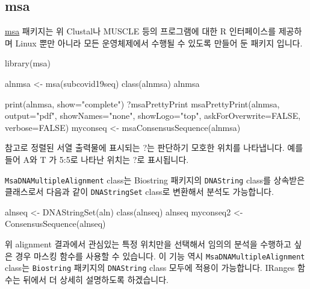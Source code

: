 \documentclass[
]{book}
\newenvironment{Shaded}{\begin{snugshade}}{\end{snugshade}}
\newcommand{\AttributeTok}[1]{\textcolor[rgb]{0.77,0.63,0.00}{#1}}
\newcommand{\ConstantTok}[1]{\textcolor[rgb]{0.00,0.00,0.00}{#1}}
\newcommand{\FunctionTok}[1]{\textcolor[rgb]{0.00,0.00,0.00}{#1}}
\newcommand{\NormalTok}[1]{#1}
\newcommand{\OtherTok}[1]{\textcolor[rgb]{0.56,0.35,0.01}{#1}}
\newcommand{\StringTok}[1]{\textcolor[rgb]{0.31,0.60,0.02}{#1}}
\begin{document}
\hypertarget{msa}{%
\subsection{msa}\label{msa}}

\href{https://www.bioconductor.org/packages/release/bioc/html/msa.html}{msa} 패키지는 위 Clustal나 MUSCLE 등의 프로그램에 대한 R 인터페이스를 제공하며 Linux 뿐만 아니라 모든 운영체제에서 수행될 수 있도록 만들어 둔 패키지 입니다.

\begin{Shaded}
\begin{Highlighting}[]
\FunctionTok{library}\NormalTok{(msa)}

\NormalTok{alnmsa }\OtherTok{\textless{}{-}} \FunctionTok{msa}\NormalTok{(subcovid19seq)}
\FunctionTok{class}\NormalTok{(alnmsa)}
\NormalTok{alnmsa}

\FunctionTok{print}\NormalTok{(alnmsa, }\AttributeTok{show=}\StringTok{"complete"}\NormalTok{)}
\NormalTok{?msaPrettyPrint}
\FunctionTok{msaPrettyPrint}\NormalTok{(alnmsa, }\AttributeTok{output=}\StringTok{"pdf"}\NormalTok{, }\AttributeTok{showNames=}\StringTok{"none"}\NormalTok{, }\AttributeTok{showLogo=}\StringTok{"top"}\NormalTok{, }\AttributeTok{askForOverwrite=}\ConstantTok{FALSE}\NormalTok{, }\AttributeTok{verbose=}\ConstantTok{FALSE}\NormalTok{)}
\NormalTok{myconseq }\OtherTok{\textless{}{-}} \FunctionTok{msaConsensusSequence}\NormalTok{(alnmsa)}
\end{Highlighting}
\end{Shaded}

참고로 정렬된 서열 출력물에 표시되는 ?는 판단하기 모호한 위치를 나타냅니다. 예를 들어 A와 T 가 5:5로 나타난 위치는 ?로 표시됩니다.

\texttt{MsaDNAMultipleAlignment} class는 Biostring 패키지의 \texttt{DNAString} class를 상속받은 클래스로서 다음과 같이 \texttt{DNAStringSet} class로 변환해서 분석도 가능합니다.

\begin{Shaded}
\begin{Highlighting}[]
\NormalTok{alnseq }\OtherTok{\textless{}{-}} \FunctionTok{DNAStringSet}\NormalTok{(aln)}
\FunctionTok{class}\NormalTok{(alnseq)}
\NormalTok{alnseq}
\NormalTok{myconseq2 }\OtherTok{\textless{}{-}} \FunctionTok{ConsensusSequence}\NormalTok{(alnseq)}
\end{Highlighting}
\end{Shaded}

위 alignment 결과에서 관심있는 특정 위치만을 선택해서 임의의 분석을 수행하고 싶은 경우 마스킹 함수를 사용할 수 있습니다. 이 기능 역시 \texttt{MsaDNAMultipleAlignment} class는 \texttt{Biostring} 패키지의 \texttt{DNAString} class 모두에 적용이 가능합니다. IRanges 함수는 뒤에서 더 상세히 설명하도록 하겠습니다.
\end{document}
